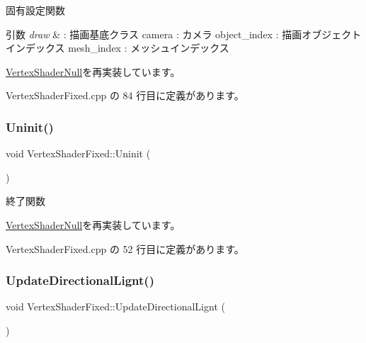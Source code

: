 固有設定関数 


\begin{DoxyParams}{引数}
{\em draw} & \+: 描画基底クラス camera \+: カメラ object\+\_\+index \+: 描画オブジェクトインデックス mesh\+\_\+index \+: メッシュインデックス \\
\hline
\end{DoxyParams}


\mbox{\hyperlink{class_vertex_shader_null_aa2234c6ea083e3c0233d59f222145992}{Vertex\+Shader\+Null}}を再実装しています。



 Vertex\+Shader\+Fixed.\+cpp の 84 行目に定義があります。

\mbox{\label{class_vertex_shader_fixed_a49f630aee4757c8fd8bae886f22dfeb0}} 
\subsubsection{\texorpdfstring{Uninit()}{Uninit()}}
{\footnotesize\ttfamily void Vertex\+Shader\+Fixed\+::\+Uninit (\begin{DoxyParamCaption}{ }\end{DoxyParamCaption})\hspace{0.3cm}{\ttfamily [virtual]}}



終了関数 



\mbox{\hyperlink{class_vertex_shader_null_a16334df4ac02db3dd63f042622032301}{Vertex\+Shader\+Null}}を再実装しています。



 Vertex\+Shader\+Fixed.\+cpp の 52 行目に定義があります。

\mbox{\label{class_vertex_shader_fixed_ae15e2c1ce81ca57cf657a6edff36cf9c}} 
\subsubsection{\texorpdfstring{Update\+Directional\+Lignt()}{UpdateDirectionalLignt()}}
{\footnotesize\ttfamily void Vertex\+Shader\+Fixed\+::\+Update\+Directional\+Lignt (\begin{DoxyParamCaption}{ }\end{DoxyParamCaption})\hspace{0.3cm}{\ttfamily [private]}}



